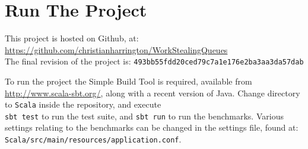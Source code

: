 \section{Run The Project}
\label{app:run}

This project is hosted on Github, at:\\ \url{https://github.com/christianharrington/WorkStealingQueues}
\\
The final revision of the project is: \texttt{493bb55fdd20ced79c7a1e176e2ba3aa3da57dab}

To run the project the Simple Build Tool is required, available from \url{http://www.scala-sbt.org/}, along with a recent version of Java. 
Change directory to \texttt{Scala} inside the repository, and execute \\ \texttt{sbt test} to run the test suite, and \texttt{sbt run} to run the benchmarks.
Various settings relating to the benchmarks can be changed in the settings file, found at: \\ \texttt{Scala/src/main/resources/application.conf}.
